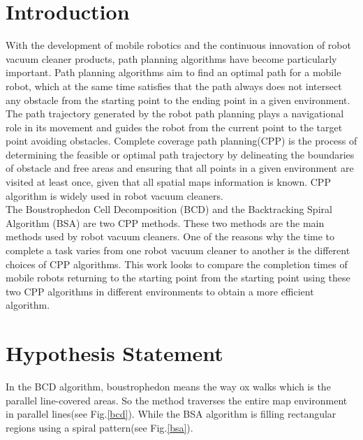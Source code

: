 \documentclass[conference]{IEEEtran}
\begin{document}
\section{Introduction}
With the development of mobile robotics and the continuous innovation of robot vacuum cleaner products, path planning algorithms have become particularly important. Path planning algorithms aim to find an optimal path for a mobile robot, which at the same time satisfies that the path always does not intersect any obstacle from the starting point to the ending point in a given environment. The path trajectory generated by the robot path planning plays a navigational role in its movement and guides the robot from the current point to the target point avoiding obstacles. Complete coverage path planning(CPP) is the process of determining the feasible or optimal path trajectory by delineating the boundaries of obstacle and free areas and ensuring that all points in a given environment are visited at least once, given that all spatial maps information is known. CPP algorithm is widely used in robot vacuum cleaners\cite{colegrave1994case}.\\
The Boustrophedon Cell Decomposition (BCD)\cite{lavalle2006planning} and the Backtracking Spiral Algorithm (BSA)\cite{gonzalez2005bsa} are two CPP methods. These two methods are the main methods used by robot vacuum cleaners. One of the reasons why the time to complete a task varies from one robot vacuum cleaner to another is the different choices of CPP algorithms. This work looks to compare the completion times of mobile robots returning to the starting point from the starting point using these two CPP algorithms in different environments to obtain a more efficient algorithm.

\section{Hypothesis Statement}
In the BCD algorithm, boustrophedon\cite{choset1998coverage} means the way ox walks which is the parallel line-covered areas. So the method traverses the entire map environment in parallel lines(see Fig.\ref{bcd}). While the BSA algorithm\cite{Gonzlez2003BSAAC} is filling rectangular regions using a spiral pattern(see Fig.\ref{bsa}).\\
\end{document}
